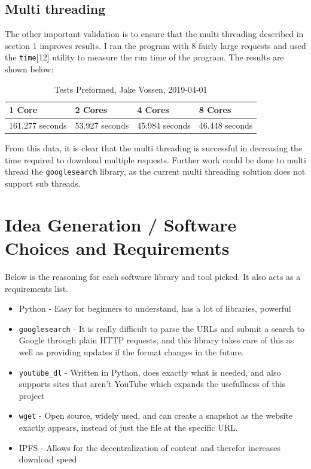 \documentclass{article}
\begin{document}
\subsection{Multi threading}
\label{multithreading}
The other important validation is to ensure that the multi threading
described in section 1 improves results. I ran the program with 8
fairly large requests and used the \texttt{time}[12] utility to measure
the run time of the program. The results are shown below:

\begin{table}[H]
\centering
\caption{\begingroup \fontsize{10pt}{12pt}\selectfont Tests Preformed,
Jake Vossen, 2019-04-01 \endgroup}
\label{my-label}
\begin{tabular}{l|l|l|l}
                                      1 Core  & 2 Cores & 4 Cores & 8
                                                                    Cores
  \\ \hline
 161.277 seconds & 53.927  seconds & 45.984  seconds & 46.448 seconds
\end{tabular}
\end{table}
From this data, it is clear that the multi threading is
successful in decreasing the time required to download multiple requests.
Further work could be done to multi thread the \texttt{googlesearch}
library, as the current multi threading solution does not support sub threads.
\section{Idea Generation / Software Choices and Requirements}

Below is the reasoning for each software library and tool picked. It
also acts as a requirements list.

\begin{itemize}
  \item Python - Easy for beginners to understand, has a lot of
    libraries, powerful
  \item \texttt{googlesearch} - It is really difficult to parse the
    URLs and submit a search to Google through plain HTTP requests,
    and this library takes care of this as well as providing updates
    if the format changes in the future.
  \item \texttt{youtube\_dl} - Written in Python, does exactly what is
    needed, and also supports sites that aren't YouTube which expands
    the usefullness of this project
  \item \texttt{wget} - Open source, widely used, and can create a
    snapshot as the website exactly appears, instead of just the file
    at the specific URL.
  \item IPFS - Allows for the decentralization of content and therefor
    increases download speed
\end{itemize}
\end{document}
